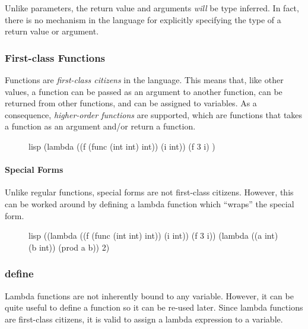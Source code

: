 \documentclass[a4paper, 12pt]{article}
\begin{document}
Unlike parameters, the return value and arguments \textit{will} be type inferred. In fact, there is no mechanism in the language for explicitly specifying the type of a return value or argument.

\subsubsection{First-class Functions}
Functions are \textit{first-class citizens} in the language. This means that, like other values, a function can be passed as an argument to another function, can be returned from other functions, and can be assigned to variables. As a consequence, \textit{higher-order functions} are supported, which are functions that takes a function as an argument and/or return a function.

\begin{figure}[htp]
    \centering
    \begin{cminted}[autogobble=true]{lisp}
        (lambda ((f (func (int int) int))
                 (i int))
          (f 3 i)
        )
    \end{cminted}
    \captionsetup[figure]{font=small}
\end{figure}

\paragraph{Special Forms}
Unlike regular functions, special forms are not first-class citizens. However, this can be worked around by defining a lambda function which ``wraps'' the special form.

\begin{figure}[htp]
    \centering
    \begin{cminted}[autogobble=true]{lisp}
        ((lambda ((f (func (int int) int))
                 (i int))
          (f 3 i))
        (lambda ((a int) (b int)) (prod a b)) 2)
    \end{cminted}
    \captionsetup[figure]{font=small}
\end{figure}

\subsubsection{define}
Lambda functions are not inherently bound to any variable. However, it can be quite useful to define a function so it can be re-used later. Since lambda functions are first-class citizens, it is valid to assign a lambda expression to a variable.
\end{document}

